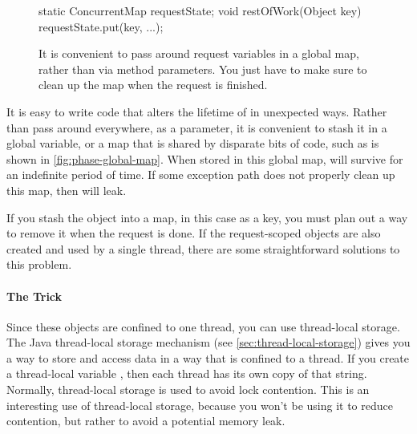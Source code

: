 \begin{figure}
\centering
\begin{framedlisting}
static ConcurrentMap requestState;
void restOfWork(Object key) {
  requestState.put(key, ...);
}
\end{framedlisting}
\caption{It is convenient to pass around request variables in a global map,
rather than via method parameters. You just have to make sure to clean up the
map when the request is finished.}
\label{fig:phase-global-map}
\end{figure}
It is easy to write code that alters the lifetime of  in unexpected
ways. Rather than pass  around everywhere, as a parameter, it is
convenient to stash it in a global variable, or a map that is shared by
disparate bits of code, such as is shown in \autoref{fig:phase-global-map}.
When stored in this global map,  will survive
for an indefinite period of time. If some exception path does not properly clean
up this map, then  will leak.

If you stash the object into a map, in this case as a key, you must plan out a
way to remove it when the  request is done. If the request-scoped
objects are also created and used by a single thread, there are some
straightforward solutions to this problem.

\paragraph{The \TLS Trick}
Since these objects are confined to one thread, you can use thread-local
storage. The Java thread-local storage mechanism (see
\autoref{sec:thread-local-storage}) gives you a way to store and access data in
a way that is confined to a thread. If you create a thread-local variable
, then each thread has its own copy of that string.
Normally, thread-local storage is used to avoid lock contention. This is an
interesting use of thread-local storage, because you won't be using it to reduce
contention, but rather to avoid a potential memory leak.

